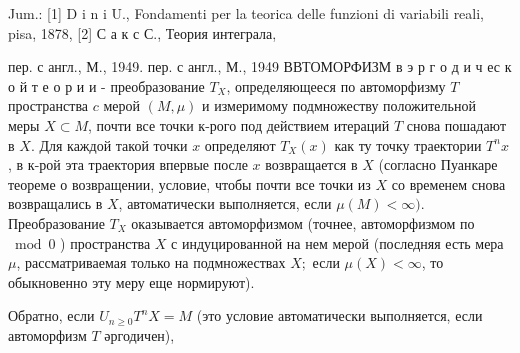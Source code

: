 \documentclass[10pt]{article}
\begin{document}
Jum.: [1] D i n i U., Fondamenti per la teorica delle funzioni di variabili reali, pisa, 1878, [2] С а к с С., Теория интеграла,

пер. с англ., М., 1949. пер. с англ., М., 1949 ВВТОМОРФИЗМ в э р г о д и ч ес к о й т е о р и и - преобразование $T_{X}$, определяющееся по автоморфизму $T$ пространства $c$ мерой $(M, \mu)$ и измеримому подмножеству положительной меры $X \subset M$, почти все точки к-рого под действием итераций $T$ снова пошадают в $X$. Для каждой такой точки $x$ определяют $T_{X}(x)$ как ту точку траектории $T^{n} x$, в к-рой эта траектория впервые после $x$ возвращается в $X$ (согласно Пуанкаре теореме о возвращении, условие, чтобы почти все точки из $X$ со временем снова возвращались в $X$, автоматически выполняется, если $\mu(M)<\infty)$. Преобразование $T_{X}$ оказывается автоморфизмом (точнее, автоморфизмом по $\bmod 0$ ) пространства $X$ с индуцированной на нем мерой (последняя есть мера $\mu$, рассматриваемая только на подмножествах $X ;$ если $\mu(X)<\infty$, то обыкновенно эту меру еще нормируют).



Обратно, если $U_{n \geqslant 0} T^{n} X=M$ (это условие автоматически выполняется, если автоморфизм $T$ әргодичен),
\end{document}
